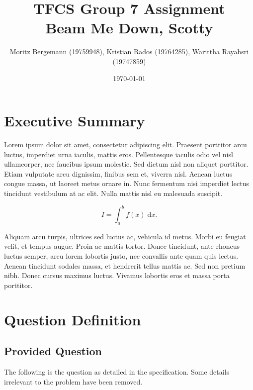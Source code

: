 \documentclass{article}
\title{
    TFCS Group 7 Assignment \\  
    \large{ %
		\vspace{0.3cm}
        Beam Me Down, Scotty
    }
} %
\author{Moritz Bergemann (19759948), Kristian Rados (19764285), Warittha Rayabsri (19747859)} %
\date{\today}
\begin{document}
\maketitle %


\section{Executive Summary} %

Lorem ipsum dolor sit amet, consectetur adipiscing elit. Praesent porttitor arcu luctus, imperdiet urna iaculis, mattis eros. Pellentesque iaculis odio vel nisl ullamcorper, nec faucibus ipsum molestie. Sed dictum nisl non aliquet porttitor. Etiam vulputate arcu dignissim, finibus sem et, viverra nisl. Aenean luctus congue massa, ut laoreet metus ornare in. Nunc fermentum nisi imperdiet lectus tincidunt vestibulum at ac elit. Nulla mattis nisl eu malesuada suscipit.

\begin{equation}
	I = \int_{a}^{b} f(x) \; \text{d}x.
\end{equation}

Aliquam arcu turpis, ultrices sed luctus ac, vehicula id metus. Morbi eu feugiat velit, et tempus augue. Proin ac mattis tortor. Donec tincidunt, ante rhoncus luctus semper, arcu lorem lobortis justo, nec convallis ante quam quis lectus. Aenean tincidunt sodales massa, et hendrerit tellus mattis ac. Sed non pretium nibh. Donec cursus maximus luctus. Vivamus lobortis eros et massa porta porttitor.

\section{Question Definition}

\subsection{Provided Question}
The following is the question as detailed in the specification. Some details irrelevant to the problem have been removed.
\end{document}
